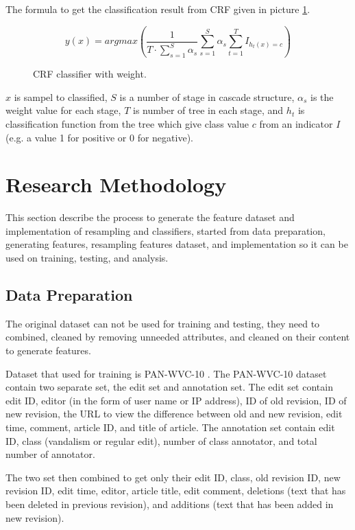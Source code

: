 \documentclass[conference,compsoc,a4paper,twocolumn,final]{IEEEtran}
\begin{document}
The formula to get the classification result from CRF given in picture
\ref{form:crf}.

\begin{figure}[h]
\[
	y(x) = argmax \left(
			\frac{1}{T \cdot \sum^{S}_{s=1} \alpha_{s} }
			\sum\limits_{s=1}^{S} \alpha_{s}
			\sum\limits^{T}_{t=1} I_{h_{t} (x) = c}
		\right)
\]
\caption{CRF classifier with weight.}
\label{form:crf}
\end{figure}

$x$ is sampel to classified,
$S$ is a number of stage in cascade structure,
$\alpha_{s}$ is the weight value for each stage,
$T$ is number of tree in each stage, and
$h_{t}$ is classification function from the tree which give class value $c$
from an indicator $I$ (e.g. a value 1 for positive or 0 for negative).


\section{Research Methodology}
\label{section:research_methodology}

This section describe the process to generate the feature dataset and
implementation of resampling and classifiers, started from data preparation,
generating features, resampling features dataset, and implementation so it can
be used on training, testing, and analysis.

\subsection{Data Preparation}
\label{subsection:data_preparation}

The original dataset can not be used for training and testing, they need to
combined, cleaned by removing unneeded attributes, and cleaned on their content
to generate features.

Dataset that used for training is PAN-WVC-10 \cite{potthast2008automatic}.
The PAN-WVC-10 dataset contain two separate set, the edit set and
annotation set.
The edit set contain edit ID, editor (in the form of user name or IP address),
ID of old revision, ID of new revision, the URL to view the difference between
old and new revision, edit time, comment, article ID, and title of article.
The annotation set contain edit ID, class (vandalism or regular edit), number
of class annotator, and total number of annotator.

The two set then combined to get only their edit ID, class, old revision ID,
new revision ID, edit time, editor, article title, edit comment, deletions
(text that has been deleted in previous revision), and additions (text that
has been added in new revision).
\end{document}
